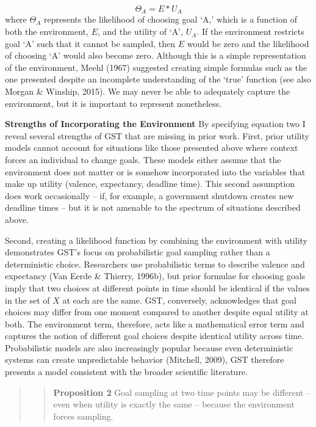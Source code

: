 \documentclass[english,,man]{apa6}
\theoremstyle{definition}
\theoremstyle{definition}
\theoremstyle{definition}
\theoremstyle{remark}
\begin{document}
\begin{equation}
\Theta_{A} = E * U_{A}
\end{equation} \noindent where \(\Theta_{A}\) represents the likelihood
of choosing goal `A,' which is a function of both the environment,
\(E\), and the utility of `A', \(U_{A}\). If the environment restricts
goal `A' such that it cannot be sampled, then \(E\) would be zero and
the likelihood of choosing `A' would also become zero. Although this is
a simple representation of the environment, Meehl (1967) suggested
creating simple formulas such as the one presented despite an incomplete
understanding of the `true' function (see also Morgan \& Winship, 2015).
We may never be able to adequately capture the environment, but it is
important to represent nonetheless.

\textbf{Strengths of Incorporating the Environment} By specifying
equation two I reveal several strengths of GST that are missing in prior
work. First, prior utility models cannot account for situations like
those presented above where context forces an individual to change
goals. These models either assume that the environment does not matter
or is somehow incorporated into the variables that make up utility
(valence, expectancy, deadline time). This second assumption does work
occasionally -- if, for example, a government shutdown creates new
deadline times -- but it is not amenable to the spectrum of situations
described above.

Second, creating a likelihood function by combining the environment with
utility demonstrates GST's focus on probabilistic goal sampling rather
than a deterministic choice. Researchers use probabilistic terms to
describe valence and expectancy (Van Eerde \& Thierry, 1996b), but prior
formulae for choosing goals imply that two choices at different points
in time should be identical if the values in the set of \(X\) at each
are the same. GST, conversely, acknowledges that goal choices may differ
from one moment compared to another despite equal utility at both. The
environment term, therefore, acts like a mathematical error term and
captures the notion of different goal choices despite identical utility
across time. Probabilistic models are also increasingly popular because
even deterministic systems can create unpredictable behavior (Mitchell,
2009), GST therefore presents a model consistent with the broader
scientific literature.

\begin{quote}
\begin{quote}
\textbf{Proposition 2} Goal sampling at two time points may be different
-- even when utility is exactly the same -- because the environment
forces sampling.
\end{quote}
\end{quote}
\end{document}
